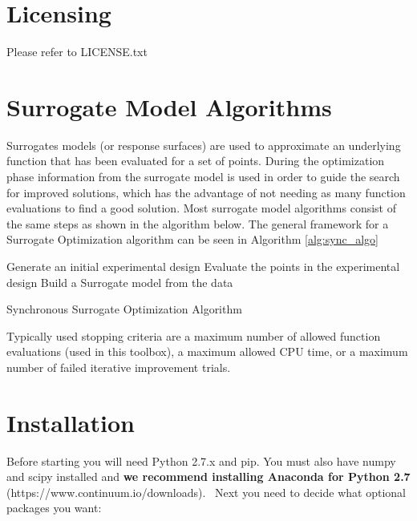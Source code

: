 \documentclass[]{article}
\begin{document}
\section{Licensing} Please refer to LICENSE.txt

\section{Surrogate Model Algorithms}
Surrogates models (or response surfaces) are used to approximate an underlying function that has 
been evaluated for a set of points. During the optimization phase information from the surrogate model 
is used in order to guide the search for improved solutions, which has the advantage of not needing as
many function evaluations to find a good solution. Most surrogate model algorithms consist of the same 
steps as shown in the algorithm below. The general framework for a Surrogate Optimization algorithm 
can be seen in Algorithm \ref{alg:sync_algo}

\begin{algorithm}[!h]
\LinesNumbered
{}

	Generate an initial experimental design\;{\label{restart}}
	Evaluate the points in the experimental design\;
	Build a Surrogate model from the data\;
\caption{Synchronous Surrogate Optimization Algorithm}
\label{alg:sync_algo}
\end{algorithm} 

\noindent Typically used stopping criteria are a maximum number of allowed function evaluations 
(used in this toolbox), a maximum allowed CPU time, or a maximum number of failed iterative 
improvement trials.

\section{Installation}
Before starting you will need Python 2.7.x and pip. You must also have numpy and scipy 
installed and \textbf{we recommend installing Anaconda for Python 2.7} \newline 
(https://www.continuum.io/downloads). \newline \ \newline Next you need to decide what 
optional packages you want:
\end{document}
